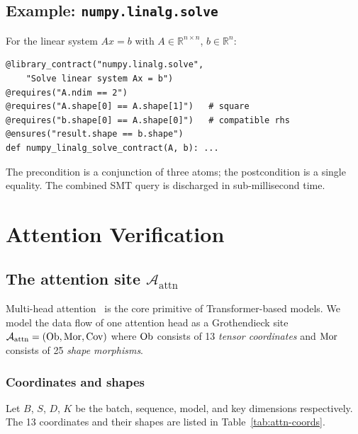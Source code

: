 \documentclass[11pt]{article}
\newcommand{\AttnSite}{\mathcal{A}_{\mathrm{attn}}}%
\begin{document}
\subsection{Example: \texttt{numpy.linalg.solve}}

For the linear system $Ax = b$ with $A \in \mathbb{R}^{n \times n}$,
$b \in \mathbb{R}^n$:

\begin{lstlisting}[style=jugeo-python,caption={\texttt{numpy.linalg.solve} contract.}]
@library_contract("numpy.linalg.solve",
    "Solve linear system Ax = b")
@requires("A.ndim == 2")
@requires("A.shape[0] == A.shape[1]")   # square
@requires("b.shape[0] == A.shape[0]")   # compatible rhs
@ensures("result.shape == b.shape")
def numpy_linalg_solve_contract(A, b): ...
\end{lstlisting}

The precondition is a conjunction of three \QFLIA{} atoms; the
postcondition is a single equality.  The combined SMT query is
discharged in sub-millisecond time.

\section{Attention Verification}
\label{sec:attn}

\subsection{The attention site $\AttnSite$}

Multi-head attention~\cite{vaswani2017attention} is the core primitive
of Transformer-based models.  We model the data flow of one attention
head as a Grothendieck site $\AttnSite = (\Ob, \Mor, \Cov)$
where $\mathrm{Ob}$ consists of 13 \emph{tensor coordinates} and $\mathrm{Mor}$
consists of 25 \emph{shape morphisms}.

\subsubsection{Coordinates and shapes}

Let $B$, $S$, $D$, $K$ be the batch, sequence, model, and key
dimensions respectively.  The 13 coordinates and their shapes are
listed in Table~\ref{tab:attn-coords}.
\end{document}
